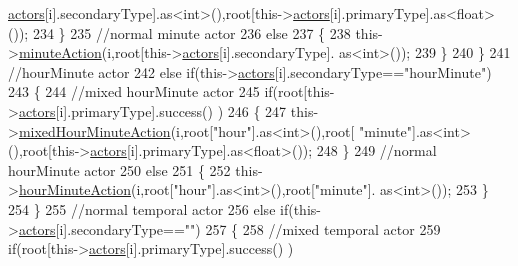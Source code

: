 \begin{DoxyCode}
      \hyperlink{class_jetpack_a7e16d2f97837f9712a2e6de1c50d99db}{actors}[i].secondaryType].as<int>(),root[this->\hyperlink{class_jetpack_a7e16d2f97837f9712a2e6de1c50d99db}{actors}[i].primaryType].as<float>());
234                         \}
235                         \textcolor{comment}{//normal minute actor}
236                         \textcolor{keywordflow}{else}
237                         \{
238                             this->\hyperlink{class_jetpack_a97da41141c7b53ddee61143519c8d17d}{minuteAction}(i,root[this->\hyperlink{class_jetpack_a7e16d2f97837f9712a2e6de1c50d99db}{actors}[i].secondaryType].
      as<int>());
239                         \}
240                     \}
241                     \textcolor{comment}{//hourMinute actor}
242                     \textcolor{keywordflow}{else} \textcolor{keywordflow}{if}(this->\hyperlink{class_jetpack_a7e16d2f97837f9712a2e6de1c50d99db}{actors}[i].secondaryType==\textcolor{stringliteral}{"hourMinute"})
243                     \{
244                         \textcolor{comment}{//mixed hourMinute actor}
245                         \textcolor{keywordflow}{if}(root[this->\hyperlink{class_jetpack_a7e16d2f97837f9712a2e6de1c50d99db}{actors}[i].primaryType].success() )
246                         \{
247                             this->\hyperlink{class_jetpack_a273dae1517b56f0242e28b8944edc26b}{mixedHourMinuteAction}(i,root[\textcolor{stringliteral}{"hour"}].as<int>(),root[\textcolor{stringliteral}{
      "minute"}].as<int>(),root[this->\hyperlink{class_jetpack_a7e16d2f97837f9712a2e6de1c50d99db}{actors}[i].primaryType].as<float>());
248                         \}
249                         \textcolor{comment}{//normal hourMinute actor}
250                         \textcolor{keywordflow}{else}
251                         \{
252                             this->\hyperlink{class_jetpack_ae01c13c785ebdf1b0bb5500234aba1bd}{hourMinuteAction}(i,root[\textcolor{stringliteral}{"hour"}].as<int>(),root[\textcolor{stringliteral}{"minute"}].
      as<int>());
253                         \}
254                     \}
255                     \textcolor{comment}{//normal temporal actor}
256                     \textcolor{keywordflow}{else} \textcolor{keywordflow}{if}(this->\hyperlink{class_jetpack_a7e16d2f97837f9712a2e6de1c50d99db}{actors}[i].secondaryType==\textcolor{stringliteral}{""})
257                     \{
258                         \textcolor{comment}{//mixed temporal actor}
259                         \textcolor{keywordflow}{if}(root[this->\hyperlink{class_jetpack_a7e16d2f97837f9712a2e6de1c50d99db}{actors}[i].primaryType].success() )

\end{DoxyCode}

